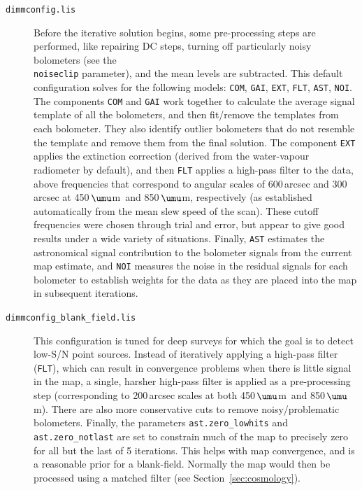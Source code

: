 \documentclass[twoside,11pt]{starlink}
\providecommand{\micron}{\mbox{\,${\umu}$m}}            %
\begin{document}
\begin{description}

\item[\texttt{dimmconfig.lis}]\quad Before the iterative solution
  begins, some pre-processing steps are performed, like repairing DC
  steps, turning off particularly noisy bolometers (see the
  \\ \texttt{noiseclip} parameter), and the mean levels are
  subtracted.  This default configuration solves for the following
  models: \texttt{COM}, \texttt{GAI}, \texttt{EXT}, \texttt{FLT},
  \texttt{AST}, \texttt{NOI}. The components \texttt{COM} and
  \texttt{GAI} work together to calculate the average signal template
  of all the bolometers, and then fit/remove the templates from each
  bolometer. They also identify outlier bolometers that do not
  resemble the template and remove them from the final solution. The
  component \texttt{EXT} applies the extinction correction (derived
  from the water-vapour radiometer by default), and then \texttt{FLT}
  applies a high-pass filter to the data, above frequencies that
  correspond to angular scales of 600\,arcsec and 300\,arcsec at
  450\micron\ and 850\micron, respectively (as established
  automatically from the mean slew speed of the scan). These cutoff
  frequencies were chosen through trial and error, but appear to give
  good results under a wide variety of situations. Finally,
  \texttt{AST} estimates the astronomical signal contribution to the
  bolometer signals from the current map estimate, and \texttt{NOI}
  measures the noise in the residual signals for each bolometer to
  establish weights for the data as they are placed into the map in
  subsequent iterations.

\item[\texttt{dimmconfig\_blank\_field.lis}]\quad This configuration
  is tuned for deep surveys for which the goal is to detect low-S/N
  point sources. Instead of iteratively applying a high-pass filter
  (\texttt{FLT}), which can result in convergence problems when there
  is little signal in the map, a single, harsher high-pass filter is
  applied as a pre-processing step (corresponding to 200\,arcsec
  scales at both 450\micron\ and 850\micron). There are also more
  conservative cuts to remove noisy/problematic bolometers. Finally,
  the parameters \texttt{ast.zero\_lowhits} and
  \texttt{ast.zero\_notlast} are set to constrain much of the map to
  precisely zero for all but the last of 5 iterations. This helps with
  map convergence, and is a reasonable prior for a
  blank-field. Normally the map would then be processed using a
  matched filter (see Section~\ref{sec:cosmology}).


\end{description}
\end{document}
